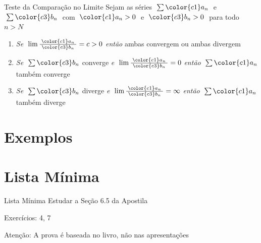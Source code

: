 \documentclass[fleqn,utf8,aspectratio=169,12pt]{beamer}
\begin{document}
\begin{frame}{Teste da Comparação no Limite}
  Sejam as séries
  \(\; \sum {\color{c1} a_n} \;\) e
  \(\; \sum {\color{c3} b_n} \;\)
  com $\;{\color{c1} a_n} > 0\;$ e $\;{\color{c3} b_n}>0\;$ para todo $n>N$
  \pause
  \vspace{\baselineskip}
  \begin{enumerate}
    \item
    \emph{Se} \(\;\lim \frac{\;{\color{c1} a_n}\;}{{\color{c3} b_n}} = c > 0 \) \;\;
    \emph{então}\; ambas convergem ou ambas divergem

    \pause
    \vfill
    \item
    \emph{Se} \(\;\sum {\color{c3} b_n}\) converge
    \tabto{36mm} \emph{e} \(\;\lim \frac{\;{\color{c1} a_n}\;}{{\color{c3} b_n}} = 0\)
    \tabto{69mm} \emph{então} \(\;\sum {\color{c1} a_n} \) também converge

    \pause
    \vfill
    \item
    \emph{Se} \(\;\sum {\color{c3} b_n}\) diverge
    \tabto{36mm} \emph{e} \(\;\lim \frac{\;{\color{c1} a_n}\;}{{\color{c3} b_n}} = \infty\)
    \tabto{69mm} \emph{então} \(\;\sum {\color{c1} a_n} \) também diverge

    \vfill
  \end{enumerate}
\end{frame}



\section{Exemplos}







\section{Lista Mínima}

\begin{frame}{Lista Mínima}
  Estudar a Seção 6.5 da Apostila

  \vspace{\baselineskip}
  Exercícios: 4, 7

  \vfill
  Atenção: A prova é baseada no livro, não nas apresentações
\end{frame}

\end{document}
